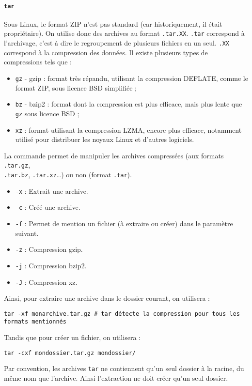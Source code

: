 \paragraph{\texttt{tar}} 
 Sous Linux, le format ZIP n'est pas standard (car historiquement, il était propriétaire). On utilise donc des archives au format \texttt{.tar.XX}. \texttt{.tar} correspond à l'archivage, c'est à dire le regroupement de plusieurs fichiers en un seul. \texttt{.XX} correspond à la compression des données. Il existe plusieurs types de compressions tels que :
\begin{itemize}
    \item \texttt{gz} - gzip : format très répandu, utilisant la compression DEFLATE, comme le format ZIP, sous licence BSD simplifiée ;
    \item \texttt{bz} - bzip2 : format dont la compression est plus efficace, mais plus lente que \texttt{gz} sous licence BSD ;
    \item \texttt{xz} : format utilisant la compression LZMA, encore plus efficace, notamment utilisé pour distribuer les noyaux Linux et d'autres logiciels.
\end{itemize}
\vspace{\baselineskip}
La commande  permet de manipuler les archives compressées (aux formats \texttt{.tar.gz}, \\ \texttt{.tar.bz}, \texttt{.tar.xz}\dots) ou non (format \texttt{.tar}).
\begin{itemize}
    \item \texttt{-x} : Extrait une archive.
    \item \texttt{-c} : Créé une archive.
    \item \texttt{-f} : Permet de mention un fichier (à extraire ou créer) dans le paramètre suivant.
    \item \texttt{-z} : Compression gzip.
    \item \texttt{-j} : Compression bzip2.
    \item \texttt{-J} : Compression xz.
\end{itemize}

Ainsi, pour extraire une archive dans le dossier courant, on utilisera : 
\begin{nscenter}
\texttt{tar -xf monarchive.tar.gz # tar détecte la compression pour tous les formats mentionnés}
\end{nscenter}
Tandis que pour créer un fichier, on utilisera : 
\begin{nscenter}
\texttt{tar -cxf mondossier.tar.gz mondossier/}
\end{nscenter}
 Par convention, les archives \texttt{tar} ne contiennent qu'un seul dossier à la racine, du même nom que l'archive. Ainsi l'extraction ne doit créer qu'un seul dossier.

